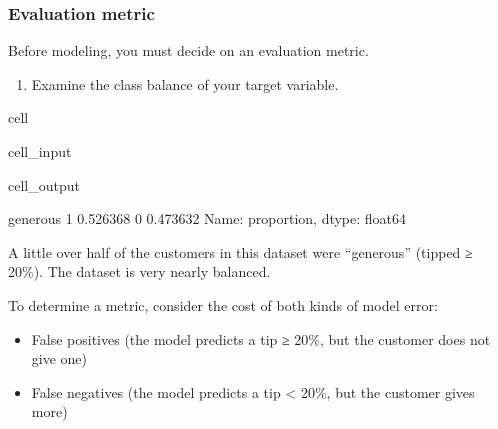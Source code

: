 \documentclass[letterpaper,10pt,english]{sphinxmanual}
\begin{document}
\subsubsection{Evaluation metric}
\label{\detokenize{Automatidata_Machine Learning:evaluation-metric}}
\sphinxAtStartPar
Before modeling, you must decide on an evaluation metric.
\begin{enumerate}
%
\item {} 
\sphinxAtStartPar
Examine the class balance of your target variable.

\end{enumerate}

\begin{sphinxuseclass}{cell}
\begin{sphinxuseclass}{cell_input}
\begin{sphinxVerbatim}[commandchars=\\\{\}]
\PYG{p}{[}\PYG{p}{]}
\end{sphinxVerbatim}

\end{sphinxuseclass}
\begin{sphinxuseclass}{cell_output}
\begin{sphinxVerbatim}[commandchars=\\\{\}]
generous
1    0.526368
0    0.473632
Name: proportion, dtype: float64
\end{sphinxVerbatim}

\end{sphinxuseclass}
\end{sphinxuseclass}
\sphinxAtStartPar
A little over half of the customers in this dataset were “generous” (tipped ≥ 20\%). The dataset is very nearly balanced.

\sphinxAtStartPar
To determine a metric, consider the cost of both kinds of model error:
\begin{itemize}
\item {} 
\sphinxAtStartPar
False positives (the model predicts a tip ≥ 20\%, but the customer does not give one)

\item {} 
\sphinxAtStartPar
False negatives (the model predicts a tip \textless{} 20\%, but the customer gives more)

\end{itemize}
\end{document}
